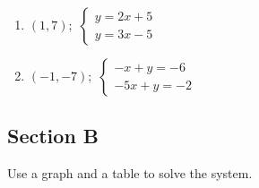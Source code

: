 \documentclass{article}
\begin{document}
\begin{enumerate}%

\item $(1,7);$
	$\begin{cases}
		y=2x+5 \\ y=3x-5
	\end{cases}$
\item $(-1,-7);$
	$\begin{cases}
		-x+y=-6 \\ -5x+y=-2
	\end{cases}$

    

\end{enumerate}%

\subsection*{Section B}
Use a graph and a table to solve the system.
\end{document}
